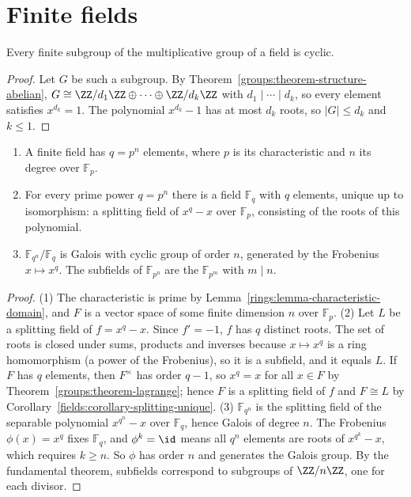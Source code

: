 \section{Finite fields}\label{fields:section-finite-fields}

\begin{lemma}\label{fields:lemma-cyclic}
Every finite subgroup of the multiplicative group of a field is cyclic.
\end{lemma}

\begin{proof}
Let $G$ be such a subgroup. By Theorem~\ref{groups:theorem-structure-abelian},
$G \cong \ZZ/d_1\ZZ \oplus \cdots \oplus \ZZ/d_k\ZZ$ with $d_1 \mid \cdots \mid d_k$, so every element satisfies
$x^{d_k} = 1$. The polynomial $x^{d_k} - 1$ has at most $d_k$ roots, so $|G| \leq d_k$ and
$k \leq 1$.
\end{proof}

\begin{theorem}\label{fields:theorem-finite-fields}
\begin{enumerate}
\item A finite field has $q = p^n$ elements, where $p$ is its characteristic and $n$ its
degree over $\mathbb{F}_p$.
\item For every prime power $q = p^n$ there is a field $\mathbb{F}_q$ with $q$ elements, unique up to
isomorphism: a splitting field of $x^q - x$ over $\mathbb{F}_p$, consisting of the roots of this
polynomial.
\item $\mathbb{F}_{q^n}/\mathbb{F}_q$ is Galois with cyclic group of order $n$, generated by the
Frobenius $x \mapsto x^q$. The subfields of $\mathbb{F}_{p^n}$ are the $\mathbb{F}_{p^m}$ with $m \mid n$.
\end{enumerate}
\end{theorem}

\begin{proof}
(1) The characteristic is prime by Lemma~\ref{rings:lemma-characteristic-domain}, and $F$ is
a vector space of some finite dimension $n$ over $\mathbb{F}_p$.
(2) Let $L$ be a splitting field of $f = x^q - x$. Since $f' = -1$, $f$ has $q$ distinct roots. The
set of roots is closed under sums, products and inverses because $x \mapsto x^q$ is a ring
homomorphism (a power of the Frobenius), so it is a subfield, and it equals $L$. If $F$ has $q$
elements, then $F^\times$ has order $q - 1$, so $x^q = x$ for all $x \in F$ by
Theorem~\ref{groups:theorem-lagrange}; hence $F$ is a splitting field of $f$ and $F \cong L$ by
Corollary~\ref{fields:corollary-splitting-unique}.
(3) $\mathbb{F}_{q^n}$ is the splitting field of the separable polynomial $x^{q^n} - x$ over
$\mathbb{F}_q$, hence Galois of degree $n$. The Frobenius $\phi(x) = x^q$ fixes $\mathbb{F}_q$, and
$\phi^k = \id$ means all $q^n$ elements are roots of $x^{q^k} - x$, which requires $k \geq n$. So $\phi$
has order $n$ and generates the Galois group. By the fundamental theorem, subfields
correspond to subgroups of $\ZZ/n\ZZ$, one for each divisor.
\end{proof}

